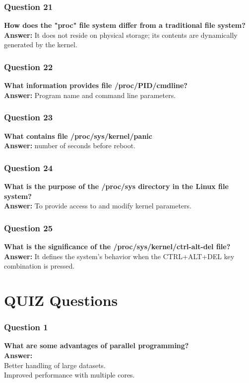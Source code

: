 \documentclass{article}
\begin{document}
\subsubsection*{Question 21}
\textbf{How does the "proc" file system differ from a traditional file system?} \\
\textbf{Answer:} It does not reside on physical storage; its contents are dynamically generated by the kernel.

\subsubsection*{Question 22}
\textbf{What information provides file /proc/PID/cmdline?} \\
\textbf{Answer:} Program name and command line parameters.

\subsubsection*{Question 23}
\textbf{What contains file /proc/sys/kernel/panic} \\
\textbf{Answer:} number of seconds before reboot.

\subsubsection*{Question 24}
\textbf{What is the purpose of the /proc/sys directory in the Linux file system?} \\
\textbf{Answer:} To provide access to and modify kernel parameters.

\subsubsection*{Question 25}
\textbf{What is the significance of the /proc/sys/kernel/ctrl-alt-del file?} \\
\textbf{Answer:} It defines the system's behavior when the CTRL+ALT+DEL key combination is pressed.

\section*{QUIZ Questions}

\subsubsection*{Question 1}
\textbf{What are some advantages of parallel programming?} \\
\textbf{Answer:} \\ 
Better handling of large datasets. \\
Improved performance with multiple cores.
\end{document}
